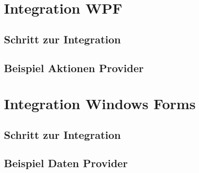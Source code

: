 \section{Integration WPF}
\label{sec:integration_wpf_impl}

\subsection{Schritt zur Integration}

\subsection{Beispiel Aktionen Provider}

\section{Integration Windows Forms}
\label{sec:integration_winforms_impl}

\subsection{Schritt zur Integration}

\subsection{Beispiel Daten Provider}

